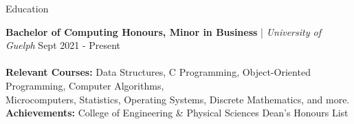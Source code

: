 \begin{rSection}{Education}

\textbf{Bachelor of Computing Honours, Minor in Business} | \textit{University of Guelph} \hfill {Sept 2021 - Present}\\
\vspace{-1em}\\
\hspace*{1em} \small \textbf{Relevant Courses:} \small \hspace*{0.6em} Data Structures, C Programming, Object-Oriented Programming, Computer Algorithms, \\ \hspace*{11.6em} Microcomputers, Statistics, Operating Systems, Discrete Mathematics, and more. \normalsize \\
\hspace*{1em} \small \textbf{Achievements:} \hspace*{2.4em}  \small College of Engineering \& Physical Sciences Dean’s Honours List

\end{rSection}
